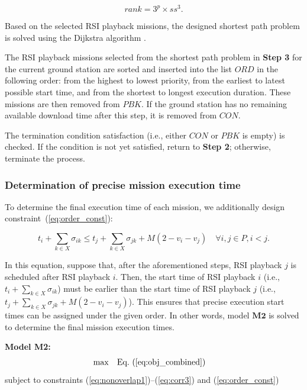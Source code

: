 \documentclass[preprint,3p,12pt,authoryear]{elsarticle}
\begin{document}
\begin{description}
    \begin{equation}
    rank = 3^{p} \times ss^3. \label{eq:rank}
    \end{equation}
    
    \item[Step 3:] Based on the selected RSI playback missions, the designed shortest path problem is solved using the Dijkstra algorithm \citep{Dijkstra1959}.
    \item[Step 4:] The RSI playback missions selected from the shortest path problem in \textbf{Step 3} for the current ground station are sorted and inserted into the list $ORD$ in the following order: from the highest to lowest priority, from the earliest to latest possible start time, and from the shortest to longest execution duration. These missions are then removed from $PBK$. If the ground station has no remaining available download time after this step, it is removed from $CON$.
    \item[Step 5:] The termination condition satisfaction (i.e., either $CON$ or $PBK$ is empty) is checked. If the condition is not yet satisfied, return to \textbf{Step 2}; otherwise, terminate the process.
\end{description}

\subsubsection{Determination of precise mission execution time}
To determine the final execution time of each mission, we additionally design constraint~(\ref{eq:order_const}):

\begin{equation}
t_i + \sum_{k \in X} \sigma_{ik} \le t_j + \sum_{k \in X} \sigma_{jk} + M(2-v_i-v_j) \quad \forall i, j \in P, i<j. \label{eq:order_const}
\end{equation}

In this equation, suppose that, after the aforementioned steps, RSI playback $j$ is scheduled after RSI playback $i$. Then, the start time of RSI playback $i$ (i.e., $t_i + \sum_{k \in X} \sigma_{ik}$) must be earlier than the start time of RSI playback $j$ (i.e., $t_j + \sum_{k \in X} \sigma_{jk} + M(2-v_i-v_j)$). This ensures that precise execution start times can be assigned under the given order. In other words, model $\textbf{M2}$ is solved to determine the final mission execution times.

\noindent\textbf{Model M2:}
\begin{align}
\max \quad & \text{Eq.}~(\ref{eq:obj_combined}) \nonumber
\end{align}
subject to constraints (\ref{eq:nonoverlap1})–(\ref{eq:corr3}) and (\ref{eq:order_const})
\end{document}
